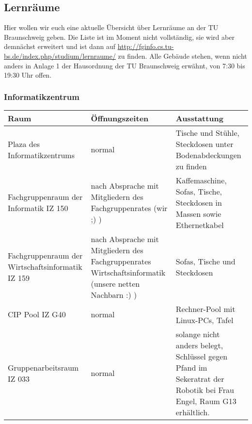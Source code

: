 \subsection{Lernräume}
	Hier wollen wir euch eine aktuelle Übersicht über Lernräume an der TU Braunschweig geben. Die Liste ist im Moment nicht vollständig, sie wird aber demnächst erweitert und ist dann auf \url{http://fginfo.cs.tu-bs.de/index.php/studium/lernraume/} zu finden. Alle Gebäude stehen, wenn nicht anders in Anlage 1 der Hausordnung der TU Braunschweig erwähnt, von 7:30 bis 19:30 Uhr offen.
	\subsubsection*{Informatikzentrum}
		\begin{tabular}{|p{4cm}|p{4cm}|p{8cm}|}
			\hline Raum & Öffnungszeiten & Ausstattung \\ 
			\hline Plaza des Informatikzentrums & normal &  Tische und Stühle, Steckdosen unter Bodenabdeckungen zu finden \\
			\hline Fachgruppenraum der Informatik IZ 150 &
			nach Absprache mit Mitgliedern des
			Fachgruppenrates (wir ;) ) & Kaffemaschine, Sofas, Tische, Steckdosen in Massen sowie Ethernetkabel\\ 
			\hline Fachgruppenraum der Wirtschaftsinformatik
			IZ 159 & nach Absprache mit Mitgliedern des
			Fachgruppenrates Wirtschaftsinformatik (unsere
			netten Nachbarn :) )& Sofas, Tische und Steckdosen \\ 
			\hline CIP Pool IZ G40 & normal & Rechner-Pool mit Linux-PCs, Tafel\\ 
			\hline Gruppenarbeitsraum IZ 033 & normal &
			solange nicht anders belegt, Schlüssel gegen
			Pfand im Sekeratrat der Robotik bei Frau Engel,
			Raum G13 erhältlich.\\
			\hline
		\end{tabular}
